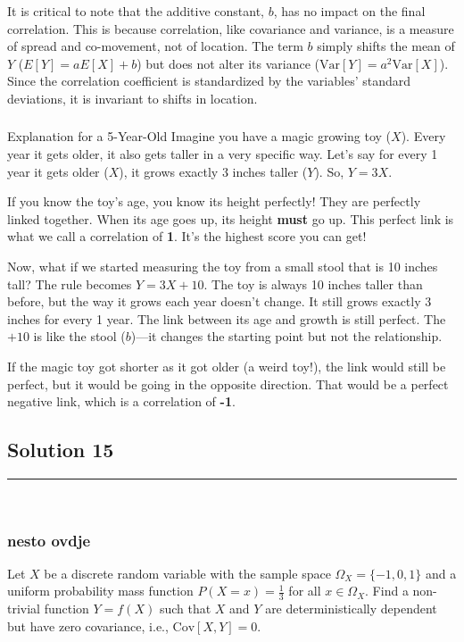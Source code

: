 \documentclass{article}
\begin{document}
It is critical to note that the additive constant, $b$, has no impact on the final correlation. This is because correlation, like covariance and variance, is a measure of spread and co-movement, not of location. The term $b$ simply shifts the mean of $Y$ ($E[Y] = aE[X] + b$) but does not alter its variance ($\text{Var}[Y] = a^2\text{Var}[X]$). Since the correlation coefficient is standardized by the variables' standard deviations, it is invariant to shifts in location.

\subsubsection*{\normalfont}{Explanation for a 5-Year-Old}
Imagine you have a magic growing toy ($X$). Every year it gets older, it also gets taller in a very specific way. Let's say for every 1 year it gets older ($X$), it grows exactly 3 inches taller ($Y$). So, $Y = 3X$.

If you know the toy's age, you know its height perfectly! They are perfectly linked together. When its age goes up, its height \textbf{must} go up. This perfect link is what we call a correlation of \textbf{1}. It's the highest score you can get!

Now, what if we started measuring the toy from a small stool that is 10 inches tall? The rule becomes $Y = 3X + 10$. The toy is always 10 inches taller than before, but the way it grows each year doesn't change. It still grows exactly 3 inches for every 1 year. The link between its age and growth is still perfect. The $+10$ is like the stool ($b$)—it changes the starting point but not the relationship.

If the magic toy got shorter as it got older (a weird toy!), the link would still be perfect, but it would be going in the opposite direction. That would be a perfect negative link, which is a correlation of \textbf{-1}.


\newpage

\subsection*{Solution 15}
\noindent\rule{\textwidth}{0.4pt}\\
\subsubsection*{nesto ovdje}

\parbox{\textwidth}{
    Let $X$ be a discrete random variable with the sample space $\Omega_X = \{-1, 0, 1\}$ and a uniform probability mass function $P(X=x) = \frac{1}{3}$ for all $x \in \Omega_X$. Find a non-trivial function $Y = f(X)$ such that $X$ and $Y$ are deterministically dependent but have zero covariance, i.e., $\text{Cov}[X, Y] = 0$.
}
\end{document}
